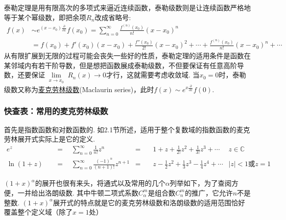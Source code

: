 泰勒定理是用有限高次的多项式来逼近连续函数，泰勒级数则是让连续函数严格地等于某个幂级数，即把余项\(R_n\)改成省略号:
\begin{align*}
    f(x) &\sim e^{(x-x_0)\frac{\partial}{\partial x}}f(x_0) = \sum_{n=0}^{\infty} \frac{f^{(n)}(x_0)}{n!}(x-x_0)^n \\
    &= f(x_0)+f'(x_0)(x-x_0)+\frac{f''(x_0)}{2!}(x-x_0)^2+\cdots+\frac{f^{(n)}(x_0)}{n!}(x-x_0)^n+\cdots
\end{align*}
从有限扩展到无限的过程可能会丧失一些好的性质，泰勒定理的适用条件是函数在某邻域内有若干阶导数，但是想把函数展成泰勒级数，不但要保证有任意高阶导数，还要保证\(\lim \limits_{\substack{x \to x_0}}R_n(x) \to 0\)才行，这就需要考虑收敛域.
当\(x_0=0\)时，泰勒级数又称为\uline{麦克劳林级数}(Maclaurin series)，此时\(f(x) \sim e^{x\frac{\partial}{\partial x}}f(0)\).

\newpage
\subsubsection{快查表：常用的麦克劳林级数}

首先是指数函数和对数函数的. 如2.1节所述，适用于整个复数域的指数函数的麦克劳林展开式实际上是它的定义.
\begin{align*}
    e^z \quad&=\quad \sum_{n=0}^{\infty} \frac{1}{n!}z^n &=&\quad 1+z+\frac{1}{2!}z^2+\frac{1}{3!}z^3 +\cdots &z\in \mathbb{C} \\
    \ln(1+z) \quad&=\quad \sum_{n=0}^{\infty}\frac{(-1)^n}{(n+1)!}z^{n+1} &=&\quad z-\frac{1}{2}z^2+\frac{1}{3}z^3-\frac{1}{4}z^4+\cdots & |z|<1\mbox{或}z=1
\end{align*}

\((1+x)^{\alpha}\)的展开也很有来头，将通式以及常用的几个\(\alpha\)列举如下，为了查阅方便，一并给出洛朗级数. 其中牛顿二项式系数\(C_\alpha^m\)是组合数\(C_n^m\)的推广，它允许\(n\)不是整数. \((1+x)^{\alpha}\)展开式的特点就是它的麦克劳林级数和洛朗级数的适用范围恰好覆盖整个定义域（除了\(x=1\)处）

